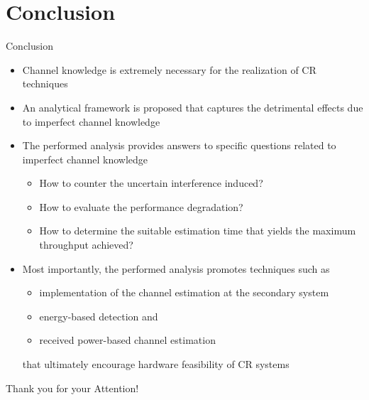 \documentclass[16pt]{beamer}
\newcommand{\fs}[2]{\fontsize{#1 pt}{#2}\selectfont}
\begin{document}
\fi
\fi

\section{Conclusion}
\begin{frame}[c]{Conclusion}
	\fs{8}{9}
		\begin{itemize}	
			\item Channel knowledge is extremely necessary for the realization of CR techniques %
			\item An analytical framework is proposed that captures the detrimental effects due to imperfect channel knowledge  
			\item The performed analysis provides answers to specific questions related to imperfect channel knowledge 
				\begin{itemize} 
				\fs{8}{9}
\item How to counter the uncertain interference induced? \item How to evaluate the performance degradation? \item How to determine the suitable estimation time that yields the maximum throughput achieved? \end{itemize}
\item Most importantly, the performed analysis promotes techniques such as 

\begin{itemize} 
\fs{8}{9}
\item implementation of the channel estimation at the secondary system \item energy-based detection and \item received power-based channel estimation \end{itemize} that ultimately encourage hardware feasibility of CR systems
		\end{itemize} 
\end{frame}

\begin{frame}[c]{}
\begin{center}
Thank you for your Attention!
\end{center}
\end{frame}
\end{document}
